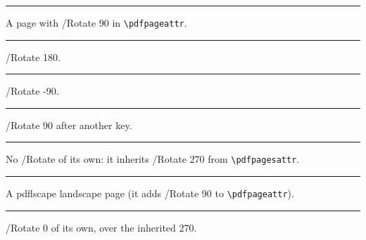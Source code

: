 \documentclass{article}
\newcommand\cornermark{\noindent\rule{2cm}{4pt}\par\medskip}
\begin{document}
\cornermark A page with /Rotate 90 in \verb|\pdfpageattr|.
\newpage
{}
\cornermark /Rotate 180.
\newpage
{}
\cornermark /Rotate -90.
\newpage
{}
\cornermark /Rotate 90 after another key.
\newpage
\pdfpageattr{}
\cornermark No /Rotate of its own: it inherits /Rotate 270 from \verb|\pdfpagesattr|.
\newpage
\begin{landscape}
\cornermark A pdflscape landscape page (it adds /Rotate 90 to \verb|\pdfpageattr|).
\end{landscape}
\cornermark /Rotate 0 of its own, over the inherited 270.
\end{document}
